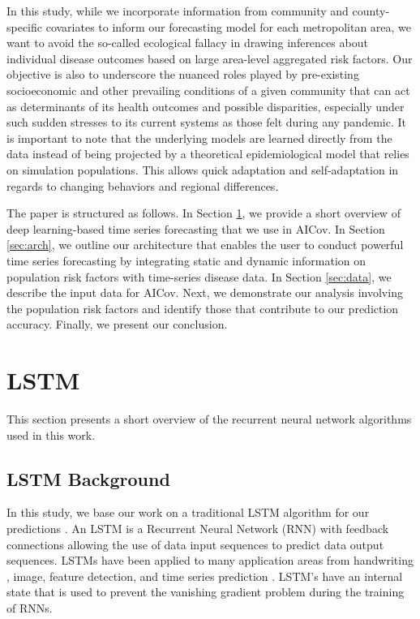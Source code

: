 \documentclass[a4paper, inpress]{jds} %
\renewcommand{\_}{%
    \textunderscore\hspace{0pt}%
}
\begin{document}
In this study, while we incorporate information from community and
county-specific covariates to inform our forecasting model for each
metropolitan area, we want to avoid the so-called ecological fallacy
in drawing inferences about individual disease outcomes based on large
area-level aggregated risk factors. Our objective is also to
underscore the nuanced roles played by pre-existing socioeconomic and
other prevailing conditions of a given community that can act as
determinants of its health outcomes and possible disparities,
especially under such sudden stresses to its current systems as those
felt during any pandemic.  It is important to note that the underlying
models are learned directly from the data instead of being projected
by a theoretical epidemiological model that relies on simulation
populations. This allows quick adaptation and self-adaptation in
regards to changing behaviors and regional differences.

The paper is structured as follows. In Section \ref{sec:lstm-theory},
we provide a short overview of deep learning-based time series
forecasting that we use in AICov. In Section \ref{sec:arch}, we
outline our architecture that enables the user to conduct powerful
time series forecasting by integrating static and dynamic information
on population risk factors with time-series disease data. In Section
\ref{sec:data}, we describe the input data for AICov. Next, we
demonstrate our analysis involving the population risk factors and
identify those that contribute to our prediction accuracy. Finally, we
present our conclusion.


\section{LSTM}
\label{sec:lstm-theory}

This section presents a short overview of the recurrent neural network
algorithms used in this work.


\subsection{LSTM Background}
\label{sec:lstm-background}

In this study, we base our work on a traditional LSTM algorithm for our predictions
\citep{www-keras-lstm,Hochreiter1997-dk}. An LSTM is a Recurrent
Neural Network (RNN) \citep{Rumelhart1986-li} with feedback
connections allowing the use of data input sequences to predict data
output sequences. LSTMs have been applied to many application areas
from handwriting \citep{Graves2009-qb}, image, feature detection, and
time series prediction \citep{Schmidhuber2005-oy}. LSTM's have an
internal state that is used to prevent the vanishing gradient problem
\citep{Hochreiter1991-mp} during the training of RNNs.
\end{document}
